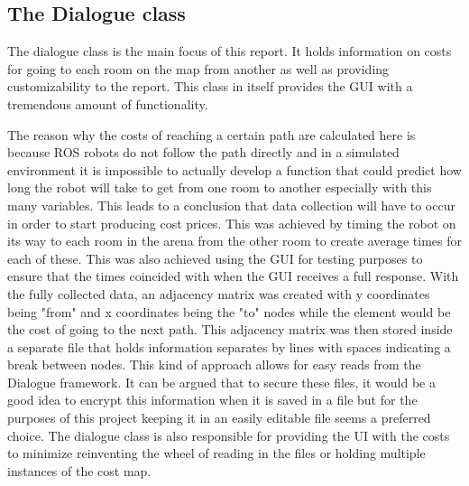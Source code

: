     \subsection{The Dialogue class}
      The dialogue class is the main focus of this report. It holds information on costs for going to each room on the map from another as well as providing customizability to the report. This class in itself provides the GUI with a tremendous amount of functionality.

      The reason why the costs of reaching a certain path are calculated here is because ROS robots do not follow the path directly and in a simulated environment it is impossible to actually develop a function that could predict how long the robot will take to get from one room to another especially with this many variables. This leads to a conclusion that data collection will have to occur in order to start producing cost prices. This was achieved by timing the robot on its way to each room in the arena from the other room to create average times for each of these. This was also achieved using the GUI for testing purposes to ensure that the times coincided with when the GUI receives a full response. With the fully collected data, an adjacency matrix was created with y coordinates being "from" and x coordinates being the "to" nodes while the element would be the cost of going to the next path. This adjacency matrix was then stored inside a separate file that holds information separates by lines with spaces indicating a break between nodes. This kind of approach allows for easy reads from the Dialogue framework. It can be argued that to secure these files, it would be a good idea to encrypt this information when it is saved in a file but for the purposes of this project keeping it in an easily editable file seems a preferred choice. The dialogue class is also responsible for providing the UI with the costs to minimize reinventing the wheel of reading in the files or holding multiple instances of the cost map.

